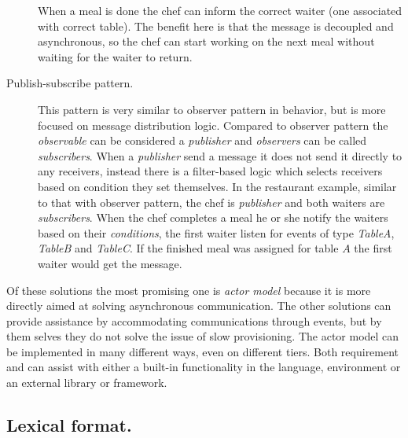 \begin{description}
    When a meal is done the chef can inform the correct waiter (one associated with correct table).
    The benefit here is that the message is decoupled and asynchronous, so the chef can start
    working on the next meal without waiting for the waiter to return.
  \item[Publish-subscribe pattern.] This pattern is very similar to observer pattern in behavior,
    but is more focused on message distribution logic.
    Compared to observer pattern the \emph{observable} can be considered a \emph{publisher} and
    \emph{observers} can be called \emph{subscribers}.
    When a \emph{publisher} send a message it does not send it directly to any receivers,
    instead there is a filter-based logic which selects receivers based on condition they set themselves.
    In the restaurant example, similar to that with observer pattern, the chef is \emph{publisher}
    and both waiters are \emph{subscribers}.
    When the chef completes a meal he or she notify the waiters based on their \emph{conditions},
    \eg the first waiter listen for events of type \emph{TableA}, \emph{TableB} and \emph{TableC}.
    If the finished meal was assigned for table $A$ the first waiter would get the message.
\end{description}
Of these solutions the most promising one is \emph{actor model} because it is more directly aimed
at solving asynchronous communication.
The other solutions can provide assistance by accommodating communications through events, 
but by them selves they do not solve the issue of slow provisioning.
The actor model can be implemented in many different ways, even on different tiers.
Both requirement  and  can assist with either
a built-in functionality in the language, environment or an external library or framework.

\subsection{Lexical format.}

